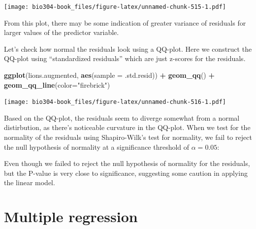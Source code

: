\documentclass[]{book}
\newenvironment{Shaded}{\begin{snugshade}}{\end{snugshade}}
\newcommand{\CommentTok}[1]{\textcolor[rgb]{0.56,0.35,0.01}{\textit{#1}}}
\newcommand{\DataTypeTok}[1]{\textcolor[rgb]{0.13,0.29,0.53}{#1}}
\newcommand{\KeywordTok}[1]{\textcolor[rgb]{0.13,0.29,0.53}{\textbf{#1}}}
\newcommand{\NormalTok}[1]{#1}
\newcommand{\OperatorTok}[1]{\textcolor[rgb]{0.81,0.36,0.00}{\textbf{#1}}}
\newcommand{\StringTok}[1]{\textcolor[rgb]{0.31,0.60,0.02}{#1}}
\theoremstyle{definition}
\theoremstyle{definition}
\theoremstyle{definition}
\theoremstyle{remark}
\begin{document}
\texttt{[image: bio304-book\_files/figure-latex/unnamed-chunk-515-1.pdf]}

From this plot, there may be some indication of greater variance of
residuals for larger values of the predictor variable.

Let's check how normal the residuals look using a QQ-plot. Here we
construct the QQ-plot using ``standardized residuals'' which are just
z-scores for the residuals.

\begin{Shaded}
\begin{Highlighting}[]
\KeywordTok{ggplot}\NormalTok{(lions.augmented, }\KeywordTok{aes}\NormalTok{(}\DataTypeTok{sample =}\NormalTok{ .std.resid)) }\OperatorTok{+}\StringTok{ }
\StringTok{  }\KeywordTok{geom_qq}\NormalTok{() }\OperatorTok{+}
\StringTok{  }\KeywordTok{geom_qq_line}\NormalTok{(}\DataTypeTok{color=}\StringTok{"firebrick"}\NormalTok{)}
\end{Highlighting}
\end{Shaded}

\texttt{[image: bio304-book\_files/figure-latex/unnamed-chunk-516-1.pdf]}

Based on the QQ-plot, the residuals seem to diverge somewhat from a
normal distirbution, as there's noticeable curvature in the QQ-plot.
When we test for the normality of the residuals using Shapiro-Wilk's
test for normality, we fail to reject the null hypothesis of normality
at a significance threshold of \(\alpha=0.05\):

\begin{Shaded}
\end{Shaded}

Even though we failed to reject the null hypothesis of normality for the
residuals, but the P-value is very close to significance, suggesting
some caution in applying the linear model.

\hypertarget{multiple-regression}{%
\chapter{Multiple regression}\label{multiple-regression}}
\end{document}
